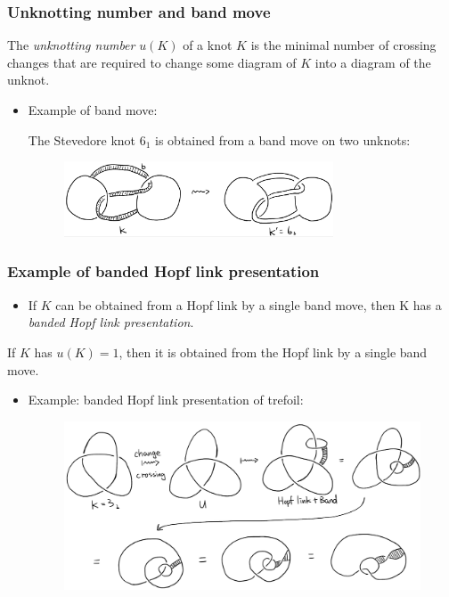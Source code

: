 \documentclass{beamer}
\theoremstyle{ex}
\theoremstyle{rem}
\begin{document}
\begin{frame}
	\frametitle{Unknotting number and band move}
	\begin{definition}
		The \textit{unknotting number} $u(K)$ of a knot $K$ is the minimal number of crossing changes that are required to change some diagram of $K$ into a diagram of the unknot.
	\end{definition}
	\begin{itemize}
		
		\item Example of band move:
		
		The Stevedore knot $6_1$ is obtained from a band move on two unknots:
		\begin{figure}
			\hspace*{-1.5cm}\begin{center}{\includegraphics [width=8cm] {bandmove}}\end{center}
		\end{figure}
	\end{itemize}
	
\end{frame}


\begin{frame}
	\frametitle{Example of banded Hopf link presentation}
	\begin{itemize}
		\item If $K$ can be obtained from a Hopf link by a single band move, then K has a \textit{banded Hopf link presentation}.
	\end{itemize}
	\begin{theorem}
		If $K$ has $u(K)=1$, then it is obtained from the Hopf link by a single band move. 
	\end{theorem}
	\begin{itemize}
		\item Example: banded Hopf link presentation of trefoil:
		\begin{figure}
			\begin{center}{\includegraphics [scale=0.3] {trefoil}}\end{center}
		\end{figure}
	\end{itemize}
\end{frame}
\end{document}
